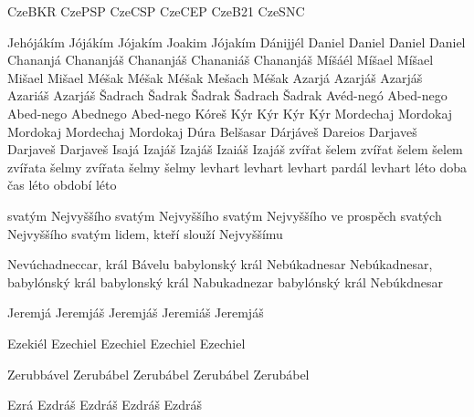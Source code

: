 
 {CzeBKR} {CzePSP} {CzeCSP} {CzeCEP} {CzeB21} {CzeSNC}

 {Jehójákím} {Jójákím} {Jójakím} {Joakim} {Jójakím}
 {Dánijjél} {Daniel} {Daniel} {Daniel} {Daniel}
 {Chananjá} {Chananjáš} {Chananjáš} {Chananiáš} {Chananjáš}
 {Míšáél} {Míšael} {Míšael} {Mišael} {Mišael}  %
 {Méšak} {Méšak} {Méšak} {Mešach} {Méšak}
 {Azarjá} {Azarjáš} {Azarjáš} {Azariáš} {Azarjáš}
 {Šadrach} {Šadrak} {Šadrak} {Šadrach} {Šadrak}
 {Avéd-negó} {Abed-nego} {Abed-nego} {Abednego} {Abed-nego} 
 {Kóreš} {Kýr} {Kýr} {Kýr} {Kýr}
 {Mordechaj} {Mordokaj} {Mordokaj} {Mordechaj} {Mordokaj}
 {} {} {Dúra} {} {} 
 {} {} {Belšasar} {} {}
 {Dárjáveš} {Dareios} {Darjaveš} {Darjaveš} {Darjaveš} %
 {Isajá} {Izajáš} {Izajáš} {Izaiáš} {Izajáš}
 {zvířat} {šelem} {zvířat} {šelem} {šelem}
 {zvířata} {šelmy} {zvířata} {šelmy} {šelmy}
 {levhart} {levhart} {levhart} {pardál} {levhart}
\vdef  
    {léto}   %
    {doba}   %
    {čas}   %
    {léto}   %
    {období}   %
    {léto}   %

 {svatým Nejvyššího} {svatým Nejvyššího} {svatým Nejvyššího} {ve prospěch svatých Nejvyššího} {svatým lidem, kteří slouží Nejvyššímu} 




       {Nevúchadneccar, král Bávelu}
       {babylonský král Nebúkadnesar}
       {Nebúkadnesar, babylónský král}
       {babylonský král Nabukadnezar}                  
       {babylónský král Nebúkdnesar}                        

        {Jeremjá} %
        {Jeremjáš} %
        {Jeremjáš} %
        {Jeremiáš} %
        {Jeremjáš} %

       {Ezekiél} %
       {Ezechiel} %
       {Ezechiel} %
       {Ezechiel} %
       {Ezechiel} %


       {Zerubbável} %
       {Zerubábel} %
       {Zerubábel} %
       {Zerubábel} %
       {Zerubábel} %

       {Ezrá} %
       {Ezdráš} %
       {Ezdráš} %
       {Ezdráš} %
       {Ezdráš} %

